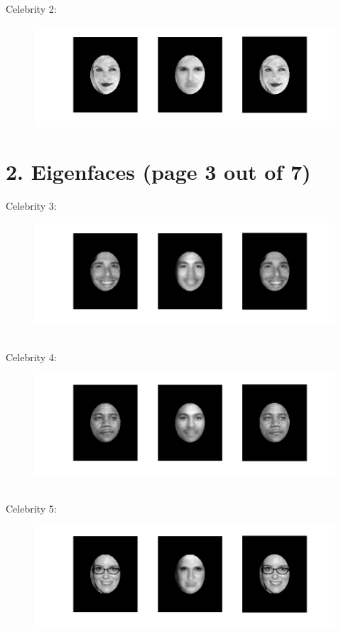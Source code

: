 \documentclass[11pt]{article}
\begin{document}
Celebrity 2:
\begin{figure}[ht!]
\centering
\includegraphics[width=180mm]{images/celeb2.png}
\label{overflow}
\end{figure}
\newpage

\section*{2. Eigenfaces (page 3 out of 7)}
Celebrity 3:
\begin{figure}[ht!]
\centering
\includegraphics[width=180mm]{images/celeb3.png}
\label{overflow}
\end{figure} \\
Celebrity 4:
\begin{figure}[ht!]
\centering
\includegraphics[width=180mm]{images/celeb4.png}
\label{overflow}
\end{figure} \\
Celebrity 5:
\begin{figure}[ht!]
\centering
\includegraphics[width=180mm]{images/celeb5.png}
\label{overflow}
\end{figure}
\newpage
\end{document}

